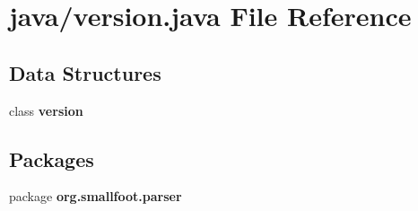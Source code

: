\section{java/version.java File Reference}
\label{version_8java}
\subsection*{Data Structures}
\begin{DoxyCompactItemize}
\item 
class {\bf version}
\end{DoxyCompactItemize}
\subsection*{Packages}
\begin{DoxyCompactItemize}
\item 
package {\bf org.\-smallfoot.\-parser}
\end{DoxyCompactItemize}
